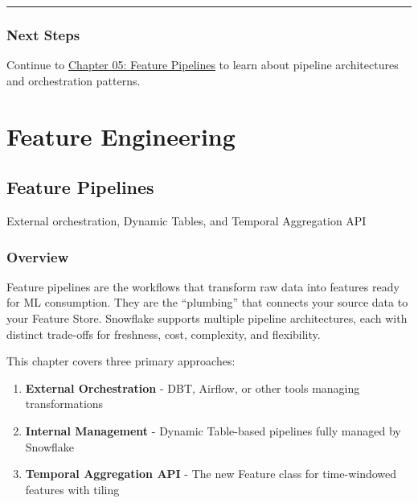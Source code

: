 \documentclass[
  letterpaper,
  DIV=11,
  numbers=noendperiod]{scrreprt}
\providecommand{\tightlist}{%
  \setlength{\itemsep}{0pt}\setlength{\parskip}{0pt}}\usepackage{longtable,booktabs,array}
\begin{document}
\begin{center}\rule{0.5\linewidth}{0.5pt}\end{center}

\hypertarget{next-steps-4}{%
\section{Next Steps}\label{next-steps-4}}

Continue to \protect\hyperlink{feature-pipelines}{Chapter 05: Feature
Pipelines} to learn about pipeline architectures and orchestration
patterns.

\part{Feature Engineering}

\hypertarget{feature-pipelines}{%
\chapter{Feature Pipelines}\label{feature-pipelines}}

External orchestration, Dynamic Tables, and Temporal Aggregation API

\hfill\break

\hypertarget{overview-5}{%
\section{Overview}\label{overview-5}}

Feature pipelines are the workflows that transform raw data into
features ready for ML consumption. They are the ``plumbing'' that
connects your source data to your Feature Store. Snowflake supports
multiple pipeline architectures, each with distinct trade-offs for
freshness, cost, complexity, and flexibility.

This chapter covers three primary approaches:

\begin{enumerate}
\def\labelenumi{\arabic{enumi}.}
\tightlist
\item
  \textbf{External Orchestration} - DBT, Airflow, or other tools
  managing transformations
\item
  \textbf{Internal Management} - Dynamic Table-based pipelines fully
  managed by Snowflake
\item
  \textbf{Temporal Aggregation API} - The new Feature class for
  time-windowed features with tiling
\end{enumerate}
\end{document}
